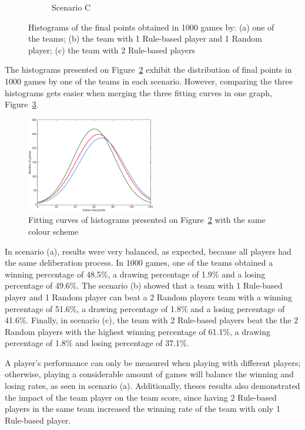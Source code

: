 \begin{figure}[h]
\begin{subfigure}[h]{0.32\textwidth}
                \caption{Scenario C}
                \label{fig:histC}
        \end{subfigure}
        \caption[Histograms of the final points obtained in the 3 scenarios]{Histograms of the final points obtained in 1000 games by: (a) one of the teams; (b) the team with 1 Rule-based player and 1 Random player; (c) the team with 2 Rule-based players}
        \label{fig:histograms}
\end{figure}

The histograms presented on Figure~\ref{fig:histograms} exhibit the distribution of final points in 1000 games by one of the teams in each scenario.
However, comparing the three histograms gets easier when merging the three fitting curves in one graph, Figure~\ref{fig:ABC}.

\begin{figure}[h!]
  \centering
    \includegraphics[width=0.5\textwidth]{./img/4/ABC}
  \caption{Fitting curves of histograms presented on Figure~\ref{fig:histograms} with the same colour scheme}
\label{fig:ABC}
\end{figure}

In scenario (a), results were very balanced, as expected, because all players had the same deliberation process.
In 1000 games, one of the teams obtained a winning percentage of 48.5\%, a drawing percentage of 1.9\% and a losing percentage of 49.6\%.
The scenario (b) showed that a team with 1 Rule-based player and 1 Random player can beat a 2 Random players team with a winning percentage of 51.6\%, a drawing percentage of 1.8\% and a losing percentage of 41.6\%.
Finally, in scenario (c), the team with 2 Rule-based players beat the the 2 Random players with the highest winning percentage of 61.1\%, a drawing percentage of 1.8\% and losing percentage of 37.1\%.

A player's performance can only be measured when playing with different players; otherwise, playing a considerable amount of games will balance the winning and losing rates, as seen in scenario (a).
Additionally, theses results also demonstrated the impact of the team player on the team score, since having 2 Rule-based players in the same team increased the winning rate of the team with only 1 Rule-based player.

